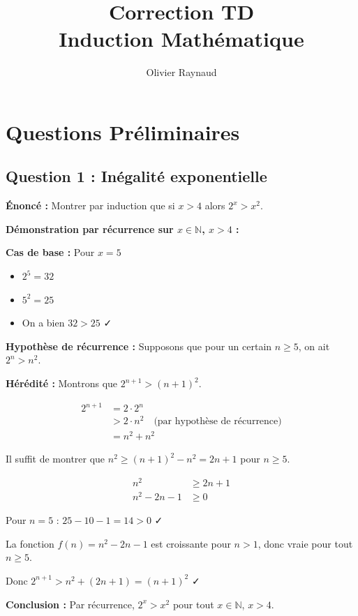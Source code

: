 \documentclass[12pt,a4paper]{article}
\title{\textbf{\Huge\color{titrebleu}Correction TD}\\[0.5em]
\large\color{defvert}Induction Mathématique}
\author{\large Olivier Raynaud}
\date{}
\begin{document}
\maketitle
\tableofcontents
\newpage

\section{Questions Préliminaires}

\subsection{Question 1 : Inégalité exponentielle}

\textbf{Énoncé :} Montrer par induction que si $x > 4$ alors $2^x > x^2$.

\begin{demonstration}
\textbf{Démonstration par récurrence sur $x \in \mathbb{N}$, $x > 4$ :}

\textbf{Cas de base :} Pour $x = 5$
\begin{itemize}
    \item $2^5 = 32$
    \item $5^2 = 25$
    \item On a bien $32 > 25$ ✓
\end{itemize}

\textbf{Hypothèse de récurrence :} Supposons que pour un certain $n \geq 5$, on ait $2^n > n^2$.

\textbf{Hérédité :} Montrons que $2^{n+1} > (n+1)^2$.

\begin{align*}
2^{n+1} &= 2 \cdot 2^n \\
&> 2 \cdot n^2 \quad \text{(par hypothèse de récurrence)} \\
&= n^2 + n^2
\end{align*}

Il suffit de montrer que $n^2 \geq (n+1)^2 - n^2 = 2n + 1$ pour $n \geq 5$.

\begin{align*}
n^2 &\geq 2n + 1 \\
n^2 - 2n - 1 &\geq 0
\end{align*}

Pour $n = 5$ : $25 - 10 - 1 = 14 > 0$ ✓

La fonction $f(n) = n^2 - 2n - 1$ est croissante pour $n > 1$, donc vraie pour tout $n \geq 5$.

Donc $2^{n+1} > n^2 + (2n+1) = (n+1)^2$ ✓

\textbf{Conclusion :} Par récurrence, $2^x > x^2$ pour tout $x \in \mathbb{N}$, $x > 4$.
\end{demonstration}
\end{document}
